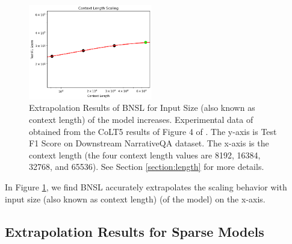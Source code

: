 \documentclass{article} %
\begin{document}
\vspace{-3.5mm}

\begin{figure}[htbp]
    \centering
\includegraphics[width=0.48\textwidth]{figures/input_length/length.png}

\vspace{-3.5mm}
    \caption{
Extrapolation Results of BNSL for Input Size (also known as context length) of the model increases. Experimental data of obtained from the CoLT5 results of Figure 4 of \cite{ainslie2023colt5}. The y-axis is Test F1 Score on Downstream NarrativeQA \citep{kovcisky2018narrativeqa} dataset. The x-axis is the context length (the four context length values are 8192, 16384, 32768, and 65536).
See Section \ref{section:length} for more details.
    }
    \label{fig:length}
\end{figure}

In Figure \ref{fig:length}, we find BNSL accurately extrapolates the scaling behavior with input size (also known as context length) (of the model) on the x-axis.


\clearpage

\subsection{Extrapolation Results for Sparse Models}
\label{section:sparse}

\vspace{-3.5mm}
\end{document}
